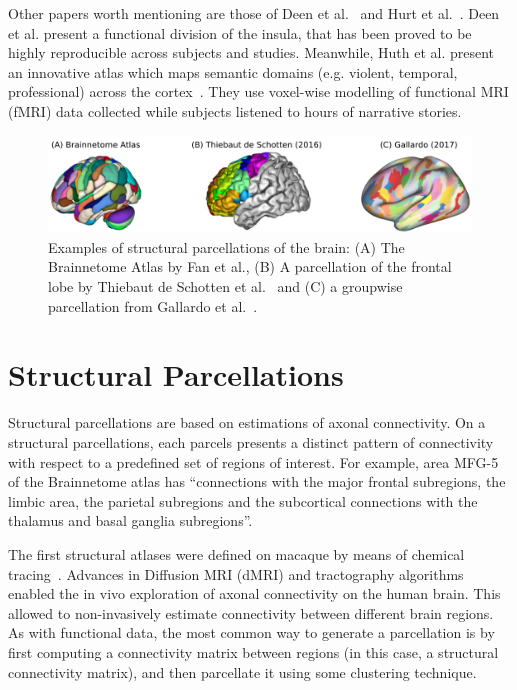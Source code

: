 Other papers worth mentioning are those of Deen et al.~\cite{Deen2011} and Hurt
et al.~\cite{Huth2016}. Deen et al. present a functional division
of the insula, that has been proved to be highly reproducible across subjects
and studies. Meanwhile, Huth et al. present an innovative atlas which maps semantic
domains (e.g. violent, temporal, professional) across the cortex~\cite{Huth2016}.
They use voxel-wise modelling of functional MRI (fMRI) data collected while 
subjects listened to hours of narrative stories.

\begin{figure}[t]
    \includegraphics[width=\textwidth]{4.brain_parcellation/img/structural.png}
    \caption{Examples of structural parcellations of the brain: (A) The Brainnetome
             Atlas by Fan et al.\cite{Fan2016}, (B) A parcellation of the
             frontal lobe by Thiebaut de Schotten et al.~\cite{ThiebautdeSchotten2016} and (C)
             a groupwise parcellation from Gallardo et al.~\cite{Gallardo2017a}.}
    \label{fig:brain_function}
\end{figure}

\section{Structural Parcellations}
\label{sec:structural}
Structural parcellations are based on estimations of axonal connectivity. On
a structural parcellations, each parcels presents a distinct pattern of
connectivity with respect to a predefined set of regions of interest. For example,
area MFG-5 of the Brainnetome atlas has ``connections 
with the major frontal subregions, the limbic area, the parietal subregions
and the subcortical connections with the thalamus and basal ganglia subregions''\cite{Fan2016}.

The first structural atlases were defined on macaque by means of chemical tracing~\cite{Stephan2013}.
Advances in Diffusion MRI (dMRI) and tractography algorithms enabled the in vivo
exploration of axonal connectivity on the human brain. This allowed to non-invasively
estimate connectivity between different brain regions. As with functional data,
the most common way to generate a parcellation is by first computing a connectivity matrix
between regions (in this case, a structural connectivity matrix), and then parcellate it using
some clustering technique.

